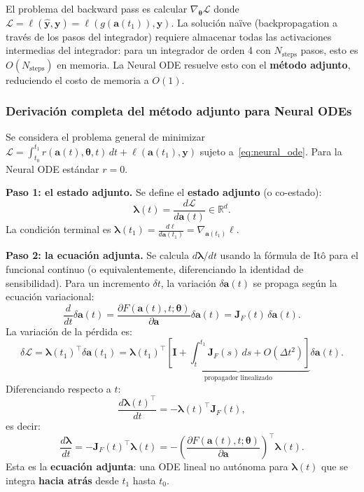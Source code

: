 El problema del backward pass es calcular $\nabla_{\bm{\theta}}\mathcal{L}$
donde $\mathcal{L} = \ell(\hat{\bm{y}}, \bm{y}) = \ell(g(\bm{a}(t_1)),\bm{y})$.
La solución naïve (backpropagation a través de los pasos del integrador) requiere
almacenar todas las activaciones intermedias del integrador: para un integrador
de orden 4 con $N_{\text{steps}}$ pasos, esto es $O(N_{\text{steps}})$ en memoria.
La Neural ODE resuelve esto con el \textbf{método adjunto}, reduciendo el costo
de memoria a $O(1)$.

\subsubsection*{Derivación completa del método adjunto para Neural ODEs}

Se considera el problema general de minimizar $\mathcal{L} = \int_{t_0}^{t_1}
r(\bm{a}(t),\bm{\theta},t)\,dt + \ell(\bm{a}(t_1),\bm{y})$ sujeto a~\eqref{eq:neural_ode}.
Para la Neural ODE estándar $r = 0$.

\medskip
\noindent\textbf{Paso 1: el estado adjunto.}
Se define el \textbf{estado adjunto} (o co-estado):
\begin{equation}
  \bm{\lambda}(t) = \frac{d\mathcal{L}}{d\bm{a}(t)} \in \mathbb{R}^d.
  \label{eq:adjunto_def}
\end{equation}
La condición terminal es $\bm{\lambda}(t_1) = \frac{d\ell}{d\bm{a}(t_1)}
= \nabla_{\bm{a}(t_1)}\ell$.

\medskip
\noindent\textbf{Paso 2: la ecuación adjunta.}
Se calcula $d\bm{\lambda}/dt$ usando la fórmula de Itô para el funcional
continuo (o equivalentemente, diferenciando la identidad de sensibilidad).
Para un incremento $\delta t$, la variación $\delta\bm{a}(t)$ se propaga
según la ecuación variacional:
\[
  \frac{d}{dt}\delta\bm{a}(t)
  = \frac{\partial F(\bm{a}(t),t;\bm{\theta})}{\partial\bm{a}}\delta\bm{a}(t)
  = \bm{J}_F(t)\,\delta\bm{a}(t).
\]
La variación de la pérdida es:
\[
  \delta\mathcal{L} = \bm{\lambda}(t_1)^\top\delta\bm{a}(t_1)
  = \bm{\lambda}(t_1)^\top
  \underbrace{\left[\bm{I} + \int_t^{t_1}\bm{J}_F(s)\,ds + O(\Delta t^2)\right]}
  _{\text{propagador linealizado}}
  \delta\bm{a}(t).
\]
Diferenciando respecto a $t$:
\[
  \frac{d\bm{\lambda}(t)^\top}{dt}
  = -\bm{\lambda}(t)^\top\bm{J}_F(t),
\]
es decir:
\begin{equation}
  \frac{d\bm{\lambda}}{dt}
  = -\bm{J}_F(t)^\top\bm{\lambda}(t)
  = -\left(\frac{\partial F(\bm{a}(t),t;\bm{\theta})}{\partial\bm{a}}\right)^\top
  \bm{\lambda}(t).
  \label{eq:adj_ode}
\end{equation}
Esta es la \textbf{ecuación adjunta}: una ODE lineal no autónoma para
$\bm{\lambda}(t)$ que se integra \textbf{hacia atrás} desde $t_1$ hasta $t_0$.

